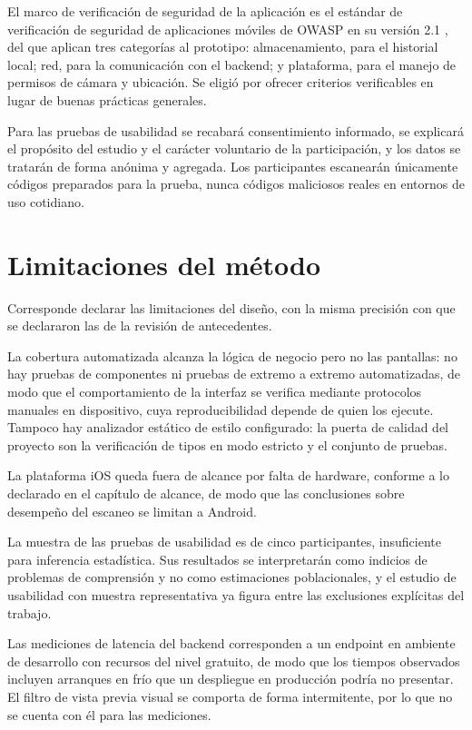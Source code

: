 El marco de verificación de seguridad de la aplicación es el estándar de verificación
de seguridad de aplicaciones móviles de OWASP en su versión 2.1
\cite{owasp2024masvs}, del que aplican tres categorías al prototipo: almacenamiento,
para el historial local; red, para la comunicación con el backend; y plataforma, para
el manejo de permisos de cámara y ubicación. Se eligió por ofrecer criterios
verificables en lugar de buenas prácticas generales.

Para las pruebas de usabilidad se recabará consentimiento informado, se explicará el
propósito del estudio y el carácter voluntario de la participación, y los datos se
tratarán de forma anónima y agregada. Los participantes escanearán únicamente códigos
preparados para la prueba, nunca códigos maliciosos reales en entornos de uso
cotidiano.

\section{Limitaciones del método}

Corresponde declarar las limitaciones del diseño, con la misma precisión con que se
declararon las de la revisión de antecedentes.

La cobertura automatizada alcanza la lógica de negocio pero no las pantallas: no hay
pruebas de componentes ni pruebas de extremo a extremo automatizadas, de modo que el
comportamiento de la interfaz se verifica mediante protocolos manuales en dispositivo,
cuya reproducibilidad depende de quien los ejecute. Tampoco hay analizador estático de
estilo configurado: la puerta de calidad del proyecto son la verificación de tipos en
modo estricto y el conjunto de pruebas.

La plataforma iOS queda fuera de alcance por falta de hardware, conforme a lo
declarado en el capítulo de alcance, de modo que las conclusiones sobre desempeño del
escaneo se limitan a Android.

La muestra de las pruebas de usabilidad es de cinco participantes, insuficiente para
inferencia estadística. Sus resultados se interpretarán como indicios de problemas de
comprensión y no como estimaciones poblacionales, y el estudio de usabilidad con
muestra representativa ya figura entre las exclusiones explícitas del trabajo.

Las mediciones de latencia del backend corresponden a un endpoint en ambiente de
desarrollo con recursos del nivel gratuito, de modo que los tiempos observados incluyen
arranques en frío que un despliegue en producción podría no presentar. El filtro de
vista previa visual se comporta de forma intermitente, por lo que no se cuenta con él
para las mediciones.

